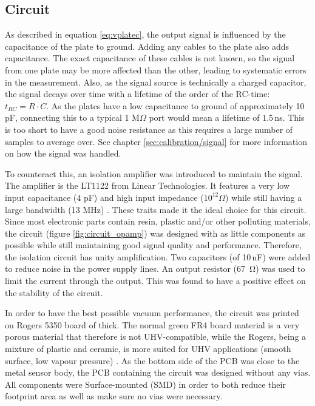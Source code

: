 \subsection{Circuit}
\label{sec:design/circuit}
As described in equation \ref{eq:vplatec}, the output signal is influenced by the capacitance of the plate to ground. Adding any cables to the plate also adds capacitance. The exact capacitance of these cables is not known, so the signal from one plate may be more affected than the other, leading to systematic errors in the measurement.
Also, as the signal source is technically a charged capacitor, the signal decays over time with a lifetime of the order of the RC-time: $t_{RC} = R\cdot C$. As the plates have a low capacitance to ground of approximately 10\,pF, connecting this to a typical 1 M$\Omega$ port would mean a lifetime of 1.5\,ns. This is too short to have a good noise resistance as this requires a large number of samples to average over. See chapter \ref{sec:calibration/signal} for more information on how the signal was handled.

To counteract this, an isolation amplifier was introduced to maintain the signal.
The amplifier is the LT1122 from Linear Technologies. It features a very low input capacitance (4 pF) and high input impedance ($10^{12} \Omega$) while still having a large bandwidth (13 MHz) \cite{LT1122}. These traits made it the ideal choice for this circuit.
Since most electronic parts contain resin, plastic and/or other polluting materials, the circuit (figure \ref{fig:circuit_opamp}) was designed with as little components as possible while still maintaining good signal quality and performance. Therefore, the isolation circuit has unity amplification. 
Two capacitors (of 10\,nF) were added to reduce noise in the power supply lines. An output resistor (\SI{67}{\ohm}) was used to limit the current through the output. This was found to have a positive effect on the stability of the circuit.

In order to have the best possible vacuum performance, the circuit was printed on Rogers 5350 board of  thick. The normal green FR4 board material is a very porous material that therefore is not UHV-compatible, while the Rogers, being a mixture of plastic and ceramic, is more suited for UHV applications (smooth surface, low vapour pressure) .
As the bottom side of the PCB was close to the metal sensor body, the PCB containing the circuit was designed without any vias. All components were Surface-mounted (SMD) in order to both reduce their footprint area as well as make sure no vias were necessary.

